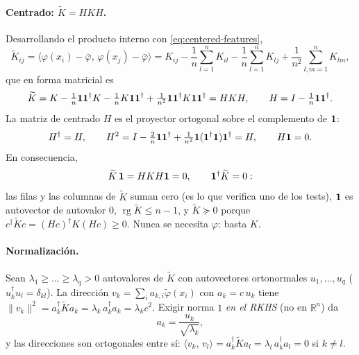 \documentclass[11pt,a4paper]{article}
\newcommand{\R}{\mathbb{R}}
\newcommand{\dg}{\dagger}                         %
\newcommand{\Kc}{\widetilde{K}}                   %
\newcommand{\inner}[2]{\langle #1,\, #2\rangle}
\newcommand{\norm}[1]{\lVert #1\rVert}
\DeclareMathOperator{\rg}{rg}
\theoremstyle{plain}
\theoremstyle{definition}
\theoremstyle{remark}
\numberwithin{equation}{section}
\begin{document}
\paragraph{Centrado: $\Kc=HKH$.} Desarrollando el producto interno con
\eqref{eq:centered-features},
\begin{equation}\label{eq:centered-entries}
  \Kc_{ij}=\inner{\varphi(x_i)-\bar\varphi}{\varphi(x_j)-\bar\varphi}
  =K_{ij}-\frac1n\sum_{l=1}^nK_{il}-\frac1n\sum_{l=1}^nK_{lj}
  +\frac1{n^2}\sum_{l,m=1}^nK_{lm},
\end{equation}
que en forma matricial es
\begin{equation}\label{eq:centering}
  \Kc=K-\tfrac1n\ones\ones^{\dg}K-\tfrac1nK\ones\ones^{\dg}
  +\tfrac1{n^2}\ones\ones^{\dg}K\ones\ones^{\dg}=HKH,
  \qquad H=I-\tfrac1n\ones\ones^{\dg}.
\end{equation}
La matriz de centrado $H$ es el proyector ortogonal sobre el complemento de $\mathbf{1}$:
\begin{equation}\label{eq:centering-projector}
  H^{\dg}=H,\qquad H^2=I-\tfrac2n\ones\ones^{\dg}+\tfrac1{n^2}\ones(\ones^{\dg}\ones)\ones^{\dg}=H,
  \qquad H\ones=0 .
\end{equation}
En consecuencia,
\begin{equation}\label{eq:centered-zero-sums}
  \Kc\,\ones=HKH\ones=0,\qquad\ones^{\dg}\Kc=0 :
\end{equation}
las filas y las columnas de $\Kc$ suman cero (es lo que verifica uno de los tests), $\mathbf{1}$
es autovector de autovalor $0$, $\rg\Kc\le n-1$, y $\Kc\succeq0$ porque
$c^{\dg}\Kc c=(Hc)^{\dg}K(Hc)\ge0$. Nunca se necesita $\varphi$: basta $K$.

\paragraph{Normalización.} Sean $\lambda_1\ge\dots\ge\lambda_q>0$ autovalores de $\Kc$ con
autovectores ortonormales $u_1,\dots,u_q$ ($u_k^{\dg}u_l=\delta_{kl}$). La dirección
$v_k=\sum_ia_{k,i}\tilde\varphi(x_i)$ con $a_k=c\,u_k$ tiene
$\norm{v_k}^2=a_k^{\dg}\Kc a_k=\lambda_k\,a_k^{\dg}a_k=\lambda_kc^2$. Exigir norma $1$
\emph{en el RKHS} (no en $\R^n$) da
\begin{equation}\label{eq:kpca-normalization}
  a_k=\frac{u_k}{\sqrt{\lambda_k}} ,
\end{equation}
y las direcciones son ortogonales entre sí:
$\inner{v_k}{v_l}=a_k^{\dg}\Kc a_l=\lambda_l\,a_k^{\dg}a_l=0$ si $k\ne l$.
\end{document}
